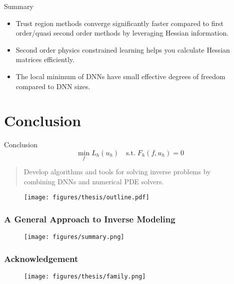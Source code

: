\documentclass[usenames,dvipsnames]{beamer}
\newcommand{\cmark}{\ding{51}}%
\begin{document}
\begin{frame}{Summary}
	\begin{itemize}
\item Trust region methods converge significantly faster compared to first order/quasi second order methods by leveraging Hessian information. 

\item Second order physics constrained learning helps you calculate Hessian matrices efficiently. 

\item The local minimum of DNNs have small effective degrees of freedom compared to DNN sizes. 
	\end{itemize}
\end{frame}


\section{Conclusion}

\begin{frame}{Conclusion}
	$$\min_{{f}} L_h(u_h) \quad \mathrm{s.t.}\; F_h({f}, u_h) = 0$$
	
	\begin{quote}
		\textcolor{green}{\cmark} Develop algorithms and tools for solving inverse problems by \\ combining DNNs and numerical PDE solvers. 
	\end{quote}
	
	
	\begin{figure}[hbt]
		\centering
		\texttt{[image: figures/thesis/outline.pdf]}
	\end{figure}
\end{frame}

\begin{frame}
	\frametitle{A General Approach to Inverse Modeling}
	\begin{figure}[hbt]
		\texttt{[image: figures/summary.png]}
	\end{figure}
\end{frame}



\begin{frame}
\frametitle{Acknowledgement}

\begin{figure}[hbt]
	\centering
	\texttt{[image: figures/thesis/family.png]}
\end{figure}

\end{frame}
\end{document}
